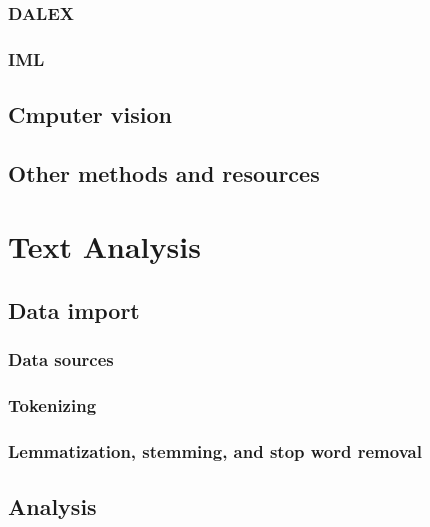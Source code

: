 \documentclass[
]{book}
\begin{document}
\hypertarget{dalex}{%
\subsection{DALEX}\label{dalex}}

\hypertarget{iml}{%
\subsection{IML}\label{iml}}

\hypertarget{cmputer-vision}{%
\section{Cmputer vision}\label{cmputer-vision}}

\hypertarget{other-methods-and-resources}{%
\section{Other methods and resources}\label{other-methods-and-resources}}

\hypertarget{text_analysis}{%
\chapter{Text Analysis}\label{text_analysis}}

\hypertarget{data-import}{%
\section{Data import}\label{data-import}}

\hypertarget{data-sources}{%
\subsection{Data sources}\label{data-sources}}

\hypertarget{tokenizing}{%
\subsection{Tokenizing}\label{tokenizing}}

\hypertarget{lemmatization-stemming-and-stop-word-removal}{%
\subsection{Lemmatization, stemming, and stop word removal}\label{lemmatization-stemming-and-stop-word-removal}}

\hypertarget{analysis}{%
\section{Analysis}\label{analysis}}
\end{document}
